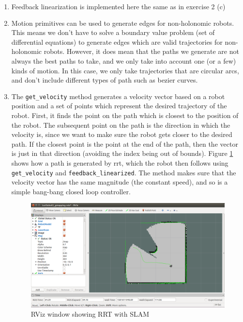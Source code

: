 \documentclass[12pt,a4paper]{article}
\begin{document}
\begin{enumerate}[label=(\alph*)]
	\item Feedback linearization is implemented here the same as in exercise 2 (c)
	\item Motion primitives can be used to generate edges for non-holonomic robots. This means we don't have to solve a boundary value problem (set of differential equations) to generate edges which are valid trajectories for non-holonomic robots. However, it does mean that the paths we generate are not always the best paths to take, and we only take into account one (or a few) kinds of motion. In this case, we only take trajectories that are circular arcs, and don't include different types of path such as bezier curves.
	\item The \texttt{get\_velocity} method generates a velocity vector based on a robot position and a set of points which represent the desired trajectory of the robot. First, it finds the point on the path which is closest to the position of the robot. The subsequent point on the path is the direction in which the velocity is, since we want to make sure the robot gets closer to the desired path. If the closest point is the point at the end of the path, then the vector is just in that direction (avoiding the index being out of bounds). Figure \ref{fig:rrt-slam} shows how a path is generated by rrt, which the robot then follows using \texttt{get\_velocity} and \texttt{feedback\_linearized}. The method makes sure that the velocity vector has the same magnitude (the constant speed), and so is a simple bang-bang closed loop controller.
	\begin{figure}[!htb]
		\centering
		\includegraphics[width=\textwidth]{fig/4c.png}
		\caption{RViz window showing RRT with SLAM}
		\label{fig:rrt-slam}
	\end{figure}

\end{enumerate}
\end{document}
